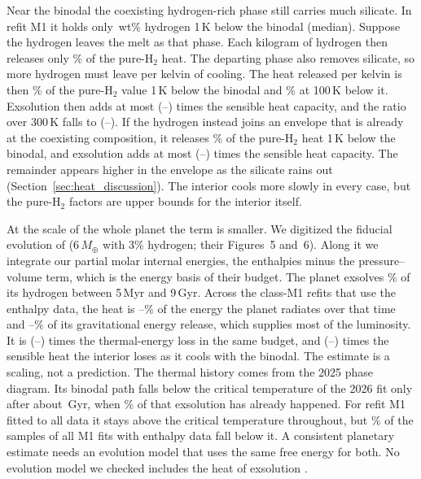 Near the binodal the coexisting hydrogen-rich phase still carries much silicate. In refit M1 it
holds only \intUpperWtThree{}\,wt\% hydrogen 1\,K below the binodal (median). Suppose the
hydrogen leaves the melt as that phase. Each kilogram of hydrogen then releases only
\intPhasePerKgThree{}\% of the pure-H$_2$ heat. The departing phase also removes silicate, so
more hydrogen must leave per kelvin of cooling. The heat released per kelvin is then
\intPhasePerKThree{}\% of the pure-H$_2$ value 1\,K below the binodal and
\intPhasePerKHundredThree{}\% at 100\,K below it. Exsolution then adds at most
\intPhaseGammaThree{} (\intPhaseGammaThreeLo{}--\intPhaseGammaThreeHi{}) times the sensible
heat capacity, and the ratio over 300\,K falls to \intPhaseRatioThree{}
(\intPhaseRatioThreeLo{}--\intPhaseRatioThreeHi{}). If the hydrogen instead joins an envelope
that is already at the coexisting composition, it releases \intNetFracThree{}\% of the
pure-H$_2$ heat 1\,K below the binodal, and exsolution adds at most \intNetGammaThree{}
(\intNetGammaThreeLo{}--\intNetGammaThreeHi{}) times the sensible heat capacity. The remainder
appears higher in the envelope as the silicate rains out (Section~\ref{sec:heat_discussion}).
The interior cools more slowly in every case, but the pure-H$_2$ factors are upper bounds for
the interior itself.

At the scale of the whole planet the term is smaller. We digitized the fiducial evolution of
\cite{rogers2025} (6\,$M_\oplus$ with 3\% hydrogen; their Figures~5 and~6). Along it we
integrate our partial molar internal energies, the enthalpies minus the pressure--volume term,
which is the energy basis of their budget. The planet exsolves \planetExsolvedPct{}\% of its
hydrogen between 5\,Myr and 9\,Gyr. Across the class-M1 refits that use the enthalpy data, the
heat is \planetRadiatedLo{}--\planetRadiatedHi{}\% of the energy the planet radiates over that
time and \planetGravityLo{}--\planetGravityHi{}\% of its gravitational energy release, which
supplies most of the luminosity. It is \planetThermal{} (\planetThermalLo{}--\planetThermalHi{})
times the thermal-energy loss in the same budget, and \planetSensible{}
(\planetSensibleLo{}--\planetSensibleHi{}) times the sensible heat the interior loses as it
cools with the binodal. The estimate is a scaling, not a prediction. The thermal history comes
from the 2025 phase diagram. Its binodal path falls below the critical temperature of the 2026
fit only after about \planetCrossPubGyr{}\,Gyr, when \planetCrossPubExsolved{}\% of that
exsolution has already happened. For refit M1 fitted to all data it stays above the critical
temperature throughout, but \planetCrossPooledPct{}\% of the samples of all M1 fits with
enthalpy data fall below it. A consistent planetary estimate needs an evolution model that uses
the same free energy for both. No evolution model we checked includes the heat of exsolution
\cite{rogers2025,rogers2026,young2026,tang2026,tejada2026}.

